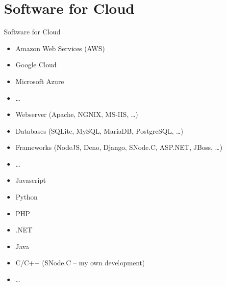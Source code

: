 ﻿\section{Software for Cloud}

\begin{frame}{Software for Cloud}
  \begin{description}[Languages]
    \item[Systems]
    \begin{itemize}
      \item \alert<2>{Amazon Web Services (AWS)}
      \item Google Cloud
      \item Microsoft Azure
      \item \ldots
    \end{itemize}
    \item[Tools]
    \begin{itemize}
      \item Webserver (Apache, NGNIX, MS-IIS, \ldots)
      \item Databases (SQLite, MySQL, \alert<2>{MariaDB}, PostgreSQL, \ldots)
      \item Frameworks (\alert<2>{NodeJS}, Deno, Django, \alert<2>{SNode.C}, ASP.NET, JBoss, \ldots)
      \item \ldots
    \end{itemize}
    \item[Languages]
    \begin{itemize}
      \item \alert<2>{Javascript}
      \item Python
      \item PHP
      \item .NET
      \item Java
      \item \alert<2>{C/C++ (SNode.C -- my own development)}
      \item \ldots
    \end{itemize}
  \end{description}
\end{frame}
